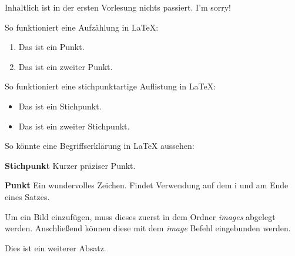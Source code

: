 Inhaltlich ist in der ersten Vorlesung nichts passiert. I'm sorry!


So funktioniert eine Aufzählung in LaTeX:

\begin{enumerate}
  \item Das ist ein Punkt.
  \item Das ist ein zweiter Punkt.
\end{enumerate}


So funktioniert eine stichpunktartige Auflistung in LaTeX:

\begin{itemize}
  \item Das ist ein Stichpunkt.
  \item Das ist ein zweiter Stichpunkt.
\end{itemize}

So könnte eine Begriffserklärung in LaTeX aussehen:

\begin{description}
  \item \textbf{Stichpunkt} Kurzer präziser Punkt.
  \item \textbf{Punkt} Ein wundervolles Zeichen. Findet Verwendung auf dem i und am Ende eines Satzes.
\end{description}

Um ein Bild einzufügen, muss dieses zuerst in dem Ordner \textit{images} abgelegt werden.
Anschließend können diese mit dem \textit{image} Befehl eingebunden werden.


Dies ist ein weiterer Absatz.
